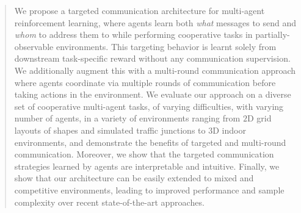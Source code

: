 \documentclass{article} %
\begin{document}

\printAffiliationsAndNotice{}

\begin{abstract}
We propose a targeted communication architecture for multi-agent reinforcement learning,
where agents learn both \emph{what} messages to send and \emph{whom} to address them to
while performing cooperative tasks in partially-observable environments.
This targeting behavior is learnt solely from downstream task-specific reward
without any communication supervision.
We additionally augment this with a multi-round communication approach where agents
coordinate via multiple rounds of communication before taking actions in the environment.
We evaluate our approach on a diverse set of cooperative multi-agent tasks, of varying difficulties,
with varying number of agents, in a variety of environments ranging from $2$D grid
layouts of shapes and simulated traffic junctions to $3$D indoor environments,
and demonstrate the benefits of targeted and multi-round communication.
Moreover, we show that the targeted communication strategies
learned by agents are interpretable and intuitive.
Finally, we show that our architecture can be easily extended
to mixed and competitive environments, leading to improved performance
and sample complexity over recent state-of-the-art approaches.
\end{abstract}









\clearpage



\end{document}
